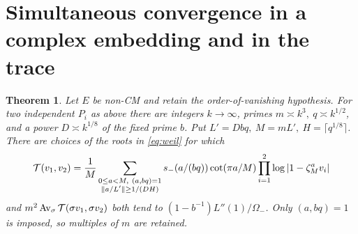 \documentclass[11pt]{article}
\newtheorem{theorem}{Theorem}[section]
\begin{document}
\section{Simultaneous convergence in a complex embedding and in the trace}
\begin{theorem}\label{th:phase}
Let \(E\) be non-CM and retain the order-of-vanishing hypothesis. For two
independent \(P_i\) as above there are integers \(k\to\infty\), primes
\(m\asymp k^3,\ q\asymp k^{1/2}\), and a power \(D\asymp k^{1/8}\)
of the fixed prime \(b\). Put \(L'=D bq,\ M=mL',\ H=\lceil q^{1/8}\rceil\).
There are choices of the roots in \eqref{eq:weil} for which
\begin{equation}\label{eq:tor}
 {\cal T}(v_1,v_2)=\frac1M
 \sum_{\substack{0\le a<M,\ (a,bq)=1\\ \|a/L'\|\ge 1/(DH)}}
 s_-(a/(bq))\cot(\pi a/M)
   \prod_{i=1}^2\log|1-\zeta_M^a v_i|
\end{equation}
and \(m^2\operatorname{Av}_\sigma{\cal T}(\sigma v_1,\sigma v_2)\) both tend to
\((1-b^{-1})L''(1)/\Omega_-\).
Only \((a,bq)=1\) is imposed, so multiples of \(m\) are retained.
\end{theorem}
\end{document}
